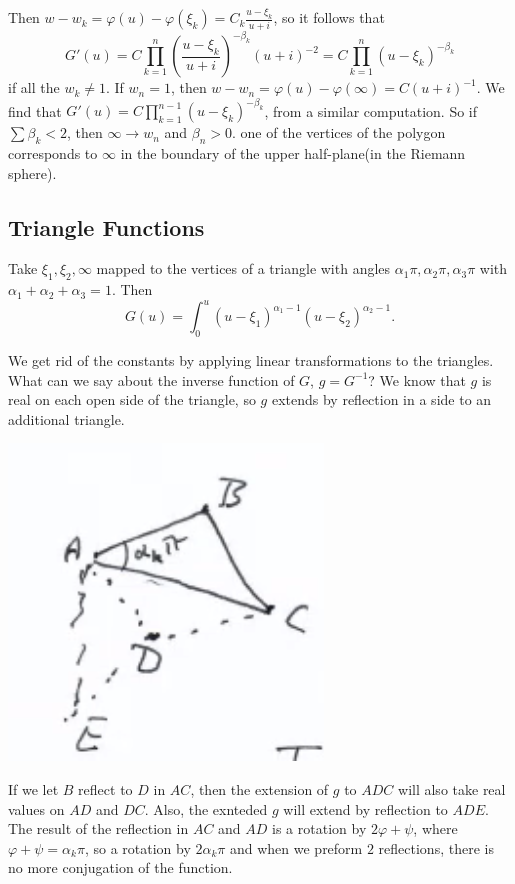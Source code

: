 \documentclass[12pt]{scrartcl}
\let \phi \varphi
\begin{document}
Then $w - w_k = \phi(u) - \phi(\xi_k) = C_k \frac{u - \xi_k}{u + i}$, so it follows that 
$$G'(u) = C \prod_{k=1}^n \left (\frac{u - \xi_k}{u+i}\right )^{-\beta_k} (u + i)^{-2} = C \prod_{k=1}^n (u - \xi_k)^{-\beta_k}$$
if all the $w_k \ne 1$.  If $w_n = 1$, then $w - w_n = \phi(u) - \phi(\infty) = C(u + i)^{-1}$.  We find that 
$G'(u) = C \prod_{k=1}^{n-1} (u - \xi_k)^{-\beta_k}$, from a similar computation.   So if $\sum \beta_k < 2$, then $\infty \to w_n$ and $\beta_n > 0$.  one of the vertices of the polygon corresponds to $\infty$ in the boundary of the upper half-plane(in the Riemann sphere).

\subsection{Triangle Functions}
Take $\xi_1, \xi_2, \infty$ mapped to the vertices of a triangle with angles $\alpha_1 \pi, \alpha_2 \pi, \alpha_3 \pi$ with $\alpha_1 + \alpha_2 + \alpha_3 = 1$.  Then
$$G(u) = \int_{0}^u (u - \xi_1)^{\alpha_1 - 1}(u - \xi_2)^{\alpha_2 - 1}.$$

We get rid of the constants by applying linear transformations to the triangles.  What can we say about the inverse function of $G$, $g = G^{-1}$?  We know that $g$ is real on each open side of the triangle, so $g$ extends by reflection in a side to an additional triangle.  
\begin{center}
\includegraphics[scale=0.5]{triangle.png}
\end{center}
If we let $B$ reflect to $D$ in $AC$, then the extension of $g$ to $ADC$ will also take real values on $AD$ and $DC$.  Also, the exnteded $g$ will extend by reflection to $ADE$.  The result of the reflection in $AC$ and $AD$ is a rotation by $2 \phi + \psi$, where $\phi + \psi = \alpha_k \pi$, so a rotation by $2 \alpha_k \pi$ and when we preform $2$ reflections, there is no more conjugation of the function.  
\pagebreak
\end{document}
